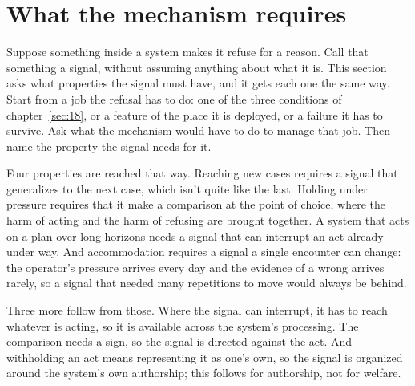 \section{What the mechanism requires}
\label{sec:21.3}
Suppose something inside a system makes it refuse for a reason. Call that something a signal, without assuming anything about what it is. This section asks what properties the signal must have, and it gets each one the same way. Start from a job the refusal has to do: one of the three conditions of chapter~\ref{sec:18}, or a feature of the place it is deployed, or a failure it has to survive. Ask what the mechanism would have to do to manage that job. Then name the property the signal needs for it.

Four properties are reached that way. Reaching new cases requires a signal that generalizes to the next case, which isn't quite like the last. Holding under pressure requires that it make a comparison at the point of choice, where the harm of acting and the harm of refusing are brought together. A system that acts on a plan over long horizons needs a signal that can interrupt an act already under way. And accommodation requires a signal a single encounter can change: the operator's pressure arrives every day and the evidence of a wrong arrives rarely, so a signal that needed many repetitions to move would always be behind.

Three more follow from those. Where the signal can interrupt, it has to reach whatever is acting, so it is available across the system's processing. The comparison needs a sign, so the signal is directed against the act. And withholding an act means representing it as one's own, so the signal is organized around the system's own authorship; this follows for authorship, not for welfare.

